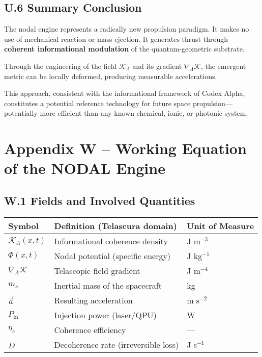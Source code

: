 \documentclass[12pt]{article}
\begin{document}
\subsection*{U.6 Summary Conclusion}

The nodal engine represents a radically new propulsion paradigm. It makes no use of mechanical reaction or mass ejection. It generates thrust through \textbf{coherent informational modulation} of the quantum-geometric substrate.

Through the engineering of the field $\mathcal{K}_\Lambda$ and its gradient $\nabla_\Lambda \mathcal{K}$, the emergent metric can be locally deformed, producing measurable accelerations.

This approach, consistent with the informational framework of Codex Alpha, constitutes a potential reference technology for future space propulsion—potentially more efficient than any known chemical, ionic, or photonic system.

\section*{Appendix W – Working Equation of the NODAL Engine}

\subsection*{W.1 Fields and Involved Quantities}

\begin{table}[H]
\centering
\begin{tabular}{lll}
\toprule
\textbf{Symbol} & \textbf{Definition (Telascura domain)} & \textbf{Unit of Measure} \\
\midrule
$\mathcal{K}_\Lambda(x,t)$ & Informational coherence density & J m$^{-3}$ \\
$\Phi(x,t)$ & Nodal potential (specific energy) & J kg$^{-1}$ \\
$\nabla_\Lambda \mathcal{K}$ & Telascopic field gradient & J m$^{-4}$ \\
$m_s$ & Inertial mass of the spacecraft & kg \\
$\vec{a}$ & Resulting acceleration & m s$^{-2}$ \\
$P_{\text{in}}$ & Injection power (laser/QPU) & W \\
$\eta_c$ & Coherence efficiency & — \\
$\dot{D}$ & Decoherence rate (irreversible loss) & J s$^{-1}$ \\
\bottomrule
\end{tabular}
\end{table}
\end{document}

